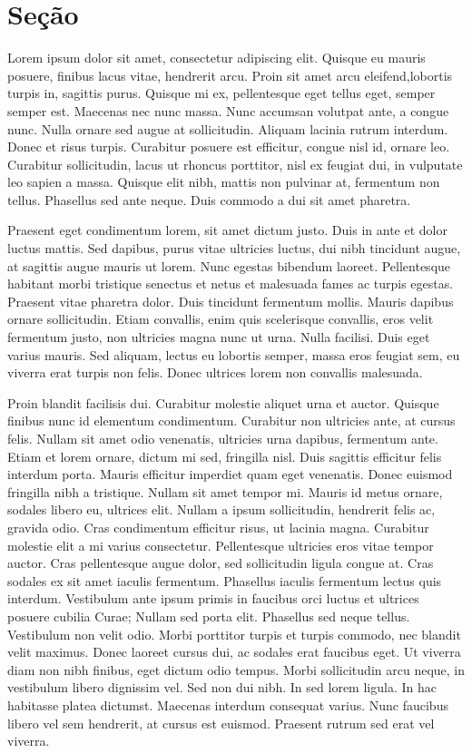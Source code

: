 \documentclass{article}
\begin{document}
	\section{Seção}
	
	\onehalfspacing
	Lorem ipsum dolor sit amet, consectetur adipiscing elit. Quisque eu
	mauris posuere, finibus lacus vitae, hendrerit arcu. Proin sit amet arcu eleifend,lobortis turpis in, sagittis purus. Quisque mi ex, pellentesque eget tellus eget, semper semper est. Maecenas nec nunc massa. Nunc accumsan volutpat ante, a congue nunc. Nulla ornare sed augue at sollicitudin. Aliquam lacinia rutrum interdum. Donec et risus turpis. Curabitur posuere est efficitur, congue nisl id, ornare leo. Curabitur sollicitudin, lacus ut rhoncus porttitor, nisl ex feugiat dui, in vulputate leo sapien a massa. Quisque elit nibh, mattis non pulvinar at, fermentum non tellus. Phasellus sed ante neque. Duis commodo a dui sit amet pharetra.
	
	Praesent eget condimentum lorem, sit amet dictum justo. Duis in ante
	et dolor luctus mattis. Sed dapibus, purus vitae ultricies luctus, dui nibh tincidunt augue, at sagittis augue mauris ut lorem. Nunc egestas bibendum laoreet. Pellentesque habitant morbi tristique senectus et netus et malesuada fames ac turpis egestas. Praesent vitae pharetra dolor. Duis tincidunt fermentum mollis. Mauris dapibus ornare sollicitudin. Etiam convallis, enim quis scelerisque convallis, eros velit fermentum justo, non ultricies magna nunc ut urna. Nulla facilisi. Duis eget varius mauris. Sed aliquam, lectus eu lobortis semper, massa eros feugiat sem, eu viverra erat turpis non felis. Donec ultrices lorem non convallis malesuada.
	
	Proin blandit facilisis dui. Curabitur molestie aliquet urna et auctor.
	Quisque finibus nunc id elementum condimentum. Curabitur non ultricies ante,
	at cursus felis. Nullam sit amet odio venenatis, ultricies urna dapibus, fermentum ante. Etiam et lorem ornare, dictum mi sed, fringilla nisl. Duis sagittis
	efficitur felis interdum porta. Mauris efficitur imperdiet quam eget venenatis.
	Donec euismod fringilla nibh a tristique.
	Nullam sit amet tempor mi. Mauris id metus ornare, sodales libero
	eu, ultrices elit. Nullam a ipsum sollicitudin, hendrerit felis ac, gravida odio.
	Cras condimentum efficitur risus, ut lacinia magna. Curabitur molestie elit a
	mi varius consectetur. Pellentesque ultricies eros vitae tempor auctor. Cras
	pellentesque augue dolor, sed sollicitudin ligula congue at. Cras sodales ex
	sit amet iaculis fermentum. Phasellus iaculis fermentum lectus quis interdum.
	Vestibulum ante ipsum primis in faucibus orci luctus et ultrices posuere cubilia
	Curae; Nullam sed porta elit.
	Phasellus sed neque tellus. Vestibulum non velit odio. Morbi porttitor
	turpis et turpis commodo, nec blandit velit maximus. Donec laoreet cursus dui,
	ac sodales erat faucibus eget. Ut viverra diam non nibh finibus, eget dictum odio
	tempus. Morbi sollicitudin arcu neque, in vestibulum libero dignissim vel. Sed
	non dui nibh. In sed lorem ligula. In hac habitasse platea dictumst. Maecenas
	interdum consequat varius. Nunc faucibus libero vel sem hendrerit, at cursus
	est euismod. Praesent rutrum sed erat vel viverra.
\end{document}
